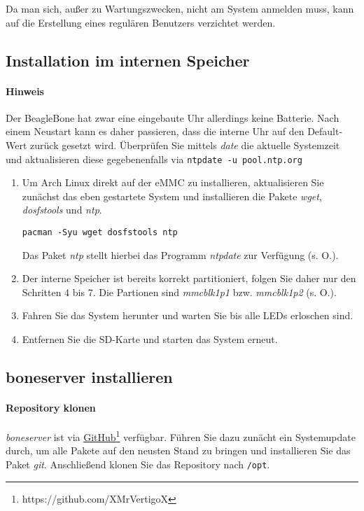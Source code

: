 \documentclass[manual.tex]{subfiles}
\begin{document}
Da man sich, außer zu Wartungszwecken, nicht am System anmelden muss, kann auf die Erstellung eines regulären Benutzers verzichtet werden.


\subsection{Installation im internen Speicher}

\paragraph{Hinweis} Der BeagleBone hat zwar eine eingebaute Uhr allerdings keine Batterie. Nach einem Neustart kann es daher passieren, dass die interne Uhr auf den Default-Wert zurück gesetzt wird. Überprüfen Sie mittels \emph{date} die aktuelle Systemzeit und aktualisieren diese gegebenenfalls via \texttt{ntpdate -u pool.ntp.org}

\begin{enumerate}
\item Um Arch Linux direkt auf der eMMC zu installieren, aktualisieren Sie zunächst das eben gestartete System und installieren die Pakete \emph{wget}, \emph{dosfstools} und \emph{ntp}.

\begin{lstlisting}
pacman -Syu wget dosfstools ntp
\end{lstlisting}

Das Paket \emph{ntp} stellt hierbei das Programm \emph{ntpdate} zur Verfügung (s. O.).

\item Der interne Speicher ist bereits korrekt partitioniert, folgen Sie daher nur den Schritten 4 bis 7. Die Partionen sind \textit{mmcblk1p1} bzw. \textit{mmcblk1p2} (s. O.).

\item Fahren Sie das System herunter und warten Sie bis alle LEDs erloschen sind.

\item Entfernen Sie die SD-Karte und starten das System erneut.
\end{enumerate}


\subsection{boneserver installieren}

\paragraph{Repository klonen}
\textit{boneserver} ist via \href{https://github.com/XMrVertigoX}{GitHub}\footnote{https://github.com/XMrVertigoX} verfügbar. Führen Sie dazu zunächt ein Systemupdate durch, um alle Pakete auf den neusten Stand zu bringen und installieren Sie das Paket \emph{git}. Anschließend klonen Sie das Repository nach \texttt{/opt}.
\end{document}
